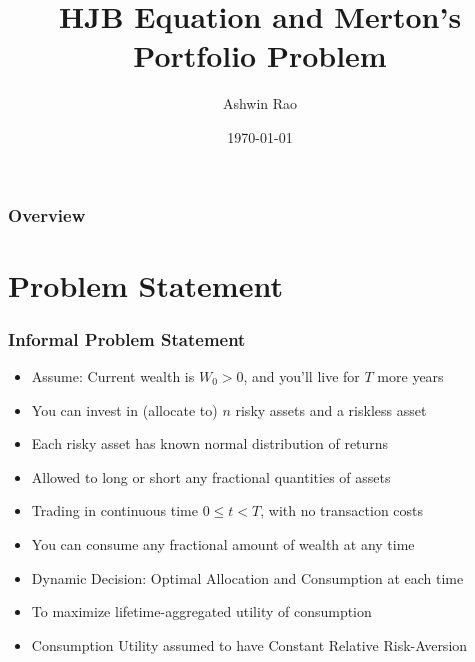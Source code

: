 \documentclass[handout]{beamer}
\title[HJB and Merton Portfolio]{HJB Equation and Merton's Portfolio Problem} %
\author{Ashwin Rao} %
\institute[Stanford] %
{
ICME, Stanford University
}
\date{\today} %
\begin{document}
\begin{frame}
\titlepage %
\end{frame}

\begin{frame}
\frametitle{Overview} %
\tableofcontents %
\end{frame}

\section{Problem Statement}

\begin{frame}
\frametitle{Informal Problem Statement}
\pause
\begin{itemize}[<+->]
\item Assume: Current wealth is $W_0 > 0$, and you'll live for $T$ more years
\item You can invest in (allocate to) $n$ risky assets and a riskless asset
\item Each risky asset has known normal distribution of returns
\item Allowed to long or short any fractional quantities of assets
\item Trading in continuous time $0 \leq t < T$, with no transaction costs
\item You can consume any fractional amount of wealth at any time
\item Dynamic Decision: Optimal Allocation and Consumption at each time
\item To maximize lifetime-aggregated utility of consumption
\item Consumption Utility assumed to have Constant Relative Risk-Aversion
\end{itemize}
\end{frame}
\end{document}
